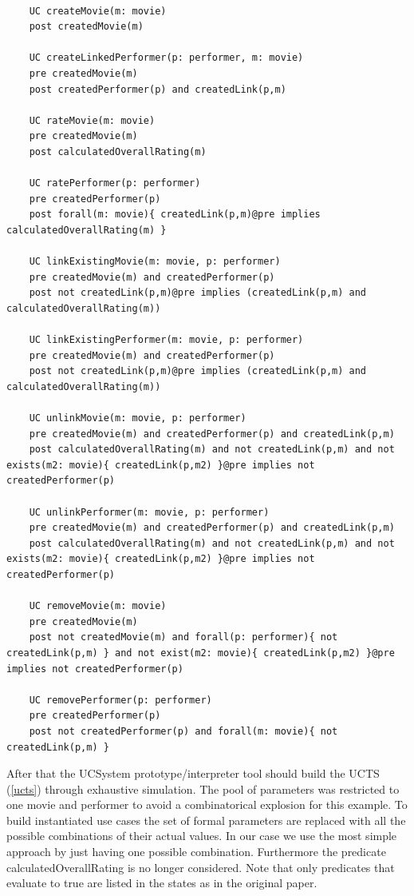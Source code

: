 \begin{lstlisting}[caption={Contracts attached to use cases},label={contracts1}]
	
	UC createMovie(m: movie)
	post createdMovie(m)
	
	UC createLinkedPerformer(p: performer, m: movie)
	pre createdMovie(m)
	post createdPerformer(p) and createdLink(p,m)
	
	UC rateMovie(m: movie)
	pre createdMovie(m)
	post calculatedOverallRating(m)
	
	UC ratePerformer(p: performer)
	pre createdPerformer(p)
	post forall(m: movie){ createdLink(p,m)@pre implies calculatedOverallRating(m) }
	
	UC linkExistingMovie(m: movie, p: performer)
	pre createdMovie(m) and createdPerformer(p)
	post not createdLink(p,m)@pre implies (createdLink(p,m) and calculatedOverallRating(m))
	
	UC linkExistingPerformer(m: movie, p: performer)
	pre createdMovie(m) and createdPerformer(p)
	post not createdLink(p,m)@pre implies (createdLink(p,m) and calculatedOverallRating(m))
	
	UC unlinkMovie(m: movie, p: performer)
	pre createdMovie(m) and createdPerformer(p) and createdLink(p,m)
	post calculatedOverallRating(m) and not createdLink(p,m) and not exists(m2: movie){ createdLink(p,m2) }@pre implies not createdPerformer(p)
	
	UC unlinkPerformer(m: movie, p: performer)
	pre createdMovie(m) and createdPerformer(p) and createdLink(p,m)
	post calculatedOverallRating(m) and not createdLink(p,m) and not exists(m2: movie){ createdLink(p,m2) }@pre implies not createdPerformer(p)
	
	UC removeMovie(m: movie)
	pre createdMovie(m)
	post not createdMovie(m) and forall(p: performer){ not createdLink(p,m) } and not exist(m2: movie){ createdLink(p,m2) }@pre implies not createdPerformer(p)
	
	UC removePerformer(p: performer)
	pre createdPerformer(p)
	post not createdPerformer(p) and forall(m: movie){ not createdLink(p,m) }
\end{lstlisting}

After that the UCSystem prototype/interpreter tool should build the UCTS (\autoref{ucts}) through exhaustive simulation. The pool of parameters was restricted to one movie and performer to avoid a combinatorical explosion for this example. To build instantiated use cases the set of formal parameters are replaced with all the possible combinations of their actual values. In our case we use the most simple approach by just having one possible combination. Furthermore the predicate calculatedOverallRating is no longer considered. Note that only predicates that evaluate to true are listed in the states as in the original paper. 

